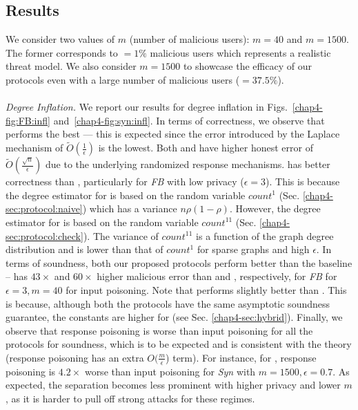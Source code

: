 \subsection{Results} \label{chap4-sec:exp-results}
 We consider two values of $m$ (number of malicious users): $m=40$ and $m=1500$. The former corresponds to $=1\%$ malicious users which represents a realistic threat model. We also consider $m=1500$ to showcase the efficacy of our protocols even with a large number of malicious users ($=37.5\%$).
\vspace{-0.2cm}\\\\\noindent\textit{Degree Inflation.} We report our results for degree inflation in Figs.~\ref{chap4-fig:FB:infl} and~\ref{chap4-fig:syn:infl}.  In terms of correctness, we observe that \DegHybrid{} performs the best --- this is expected since the error introduced by the Laplace mechanism of $\tilde{O}(\frac{1}{\epsilon})$ is the lowest. Both \DegRRCheck{} and \DegRRNaive{}  have higher honest error of $\tilde{O}(\frac{\sqrt{n}}{\epsilon})$ due to the underlying randomized response mechanisms. \DegRRCheck{} has better correctness than \DegRRNaive{}, particularly for \textit{FB} with low privacy ($\epsilon=3$). This is because the degree estimator for \DegRRNaive{} is based on the random variable $count^{1}$  (Sec. \ref{chap4-sec:protocol:naive}) which  has a variance $n\rho(1-\rho)$. However, the degree estimator for \DegRRCheck{} is based on the random variable $count^{11}$ (Sec. \ref{chap4-sec:protocol:check}). The variance of $count^{11}$ is a function of the graph degree distribution and is lower than that of $count^{1}$ for sparse graphs and high $\epsilon$. 
In terms of soundness, both our proposed protocols perform better than the baseline  -- \DegRRNaive{}  has $43\times$ and $60\times$ higher malicious error than \DegHybrid{} and \DegRRCheck, respectively, for \textit{FB} for $\epsilon=3, m=40$ for input poisoning. Note that \DegRRCheck{} performs slightly better than \DegHybrid. This is because, although both the protocols have the same asymptotic soundness guarantee, the constants are higher for \DegHybrid (see Sec. \ref{chap4-sec:hybrid}). %
Finally, we observe that response poisoning is worse than input poisoning for all the protocols for soundness, which is to be expected and is consistent with the theory (response poisoning has an extra $O(\frac{m}{\epsilon}$) term). For instance, for \DegRRCheck{}, response poisoning is $4.2\times$ worse than input poisoning for \textit{Syn} with $m=1500,\epsilon=0.7$. As expected, the separation becomes less prominent with higher privacy and lower $m$, as it is harder to pull off strong attacks for these regimes.



